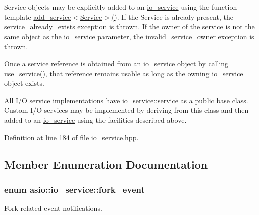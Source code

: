 Service objects may be explicitly added to an \hyperlink{classasio_1_1io__service}{io\+\_\+service} using the function template {\ttfamily \hyperlink{classasio_1_1io__service_a24cdada519607ebd767d5c01d144a48c}{add\+\_\+service$<$\+Service$>$()}}. If the {\ttfamily Service} is already present, the \hyperlink{classasio_1_1service__already__exists}{service\+\_\+already\+\_\+exists} exception is thrown. If the owner of the service is not the same object as the \hyperlink{classasio_1_1io__service}{io\+\_\+service} parameter, the \hyperlink{classasio_1_1invalid__service__owner}{invalid\+\_\+service\+\_\+owner} exception is thrown.

Once a service reference is obtained from an \hyperlink{classasio_1_1io__service}{io\+\_\+service} object by calling \hyperlink{classasio_1_1io__service_a8e909785743737fed207a4c058399d7e}{use\+\_\+service()}, that reference remains usable as long as the owning \hyperlink{classasio_1_1io__service}{io\+\_\+service} object exists.

All I/\+O service implementations have \hyperlink{classasio_1_1io__service_1_1service}{io\+\_\+service\+::service} as a public base class. Custom I/\+O services may be implemented by deriving from this class and then added to an \hyperlink{classasio_1_1io__service}{io\+\_\+service} using the facilities described above. 

Definition at line 184 of file io\+\_\+service.\+hpp.



\subsection{Member Enumeration Documentation}
\hypertarget{classasio_1_1io__service_a45f084ae64e601f7ead3f891d5ed0fc6}{}
\subsubsection[{fork\+\_\+event}]{\setlength{\rightskip}{0pt plus 5cm}enum {\bf asio\+::io\+\_\+service\+::fork\+\_\+event}}\label{classasio_1_1io__service_a45f084ae64e601f7ead3f891d5ed0fc6}


Fork-\/related event notifications. 

